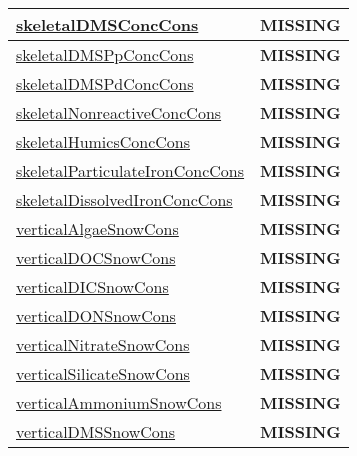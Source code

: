 {\begin{center}
\begin{longtable}{| p{2.0in} | p{4.0in} |}
    \hline
    \hyperref[subsec:var_sec_tracer_conservation_skeletalDMSConcCons]{skeletalDMSConcCons} & {\bf \color{red} MISSING} \\
    \hline
    \hyperref[subsec:var_sec_tracer_conservation_skeletalDMSPpConcCons]{skeletalDMSPpConcCons} & {\bf \color{red} MISSING} \\
    \hline
    \hyperref[subsec:var_sec_tracer_conservation_skeletalDMSPdConcCons]{skeletalDMSPdConcCons} & {\bf \color{red} MISSING} \\
    \hline
    \hyperref[subsec:var_sec_tracer_conservation_skeletalNonreactiveConcCons]{skeletalNonreactiveConcCons} & {\bf \color{red} MISSING} \\
    \hline
    \hyperref[subsec:var_sec_tracer_conservation_skeletalHumicsConcCons]{skeletalHumicsConcCons} & {\bf \color{red} MISSING} \\
    \hline
    \hyperref[subsec:var_sec_tracer_conservation_skeletalParticulateIronConcCons]{skeletalParticulateIronConcCons} & {\bf \color{red} MISSING} \\
    \hline
    \hyperref[subsec:var_sec_tracer_conservation_skeletalDissolvedIronConcCons]{skeletalDissolvedIronConcCons} & {\bf \color{red} MISSING} \\
    \hline
    \hyperref[subsec:var_sec_tracer_conservation_verticalAlgaeSnowCons]{verticalAlgaeSnowCons} & {\bf \color{red} MISSING} \\
    \hline
    \hyperref[subsec:var_sec_tracer_conservation_verticalDOCSnowCons]{verticalDOCSnowCons} & {\bf \color{red} MISSING} \\
    \hline
    \hyperref[subsec:var_sec_tracer_conservation_verticalDICSnowCons]{verticalDICSnowCons} & {\bf \color{red} MISSING} \\
    \hline
    \hyperref[subsec:var_sec_tracer_conservation_verticalDONSnowCons]{verticalDONSnowCons} & {\bf \color{red} MISSING} \\
    \hline
    \hyperref[subsec:var_sec_tracer_conservation_verticalNitrateSnowCons]{verticalNitrateSnowCons} & {\bf \color{red} MISSING} \\
    \hline
    \hyperref[subsec:var_sec_tracer_conservation_verticalSilicateSnowCons]{verticalSilicateSnowCons} & {\bf \color{red} MISSING} \\
    \hline
    \hyperref[subsec:var_sec_tracer_conservation_verticalAmmoniumSnowCons]{verticalAmmoniumSnowCons} & {\bf \color{red} MISSING} \\
    \hline
    \hyperref[subsec:var_sec_tracer_conservation_verticalDMSSnowCons]{verticalDMSSnowCons} & {\bf \color{red} MISSING} \\

\end{longtable}
\end{center}}
